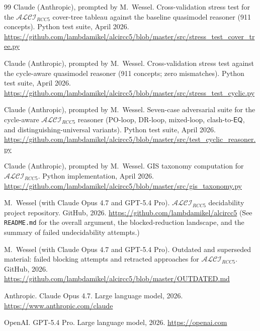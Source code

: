 \documentclass[
]{ceurart}
\theoremstyle{definition}
\newcommand{\ALCIRCC}[1]{\ensuremath{\mathcal{ALCI}_{\mathit{RCC#1}}}}
\newcommand{\EQ}{\ensuremath{\mathsf{EQ}}}
\begin{document}
\begin{thebibliography}{99}
Claude (Anthropic), prompted by M.\ Wessel.
\newblock Cross-validation stress test for the $\ALCIRCC{5}$
  cover-tree tableau against the baseline quasimodel reasoner
  (911 concepts).
\newblock Python test suite, April 2026.
\newblock \url{https://github.com/lambdamikel/alcircc5/blob/master/src/stress_test_cover_tree.py}

Claude (Anthropic), prompted by M.\ Wessel.
\newblock Cross-validation stress test against the cycle-aware
  quasimodel reasoner (911 concepts; zero mismatches).
\newblock Python test suite, April 2026.
\newblock \url{https://github.com/lambdamikel/alcircc5/blob/master/src/stress_test_cyclic.py}

Claude (Anthropic), prompted by M.\ Wessel.
\newblock Seven-case adversarial suite for the cycle-aware
  $\ALCIRCC{5}$ reasoner (PO-loop, DR-loop, mixed-loop,
  clash-to-$\EQ$, and distinguishing-universal variants).
\newblock Python test suite, April 2026.
\newblock \url{https://github.com/lambdamikel/alcircc5/blob/master/src/test_cyclic_reasoner.py}

Claude (Anthropic), prompted by M.\ Wessel.
\newblock GIS taxonomy computation for $\ALCIRCC{5}$.
\newblock Python implementation, April 2026.
\newblock \url{https://github.com/lambdamikel/alcircc5/blob/master/src/gis_taxonomy.py}


M.\ Wessel (with Claude Opus 4.7 and GPT-5.4 Pro).
\newblock $\ALCIRCC{5}$ decidability project repository.
\newblock GitHub, 2026.
\newblock \url{https://github.com/lambdamikel/alcircc5}
\newblock (See \texttt{README.md} for the overall argument, the
  blocked-reduction landscape, and the summary of failed
  undecidability attempts.)

M.\ Wessel (with Claude Opus 4.7 and GPT-5.4 Pro).
\newblock Outdated and superseded material: failed blocking
  attempts and retracted approaches for $\ALCIRCC{5}$.
\newblock GitHub, 2026.
\newblock \url{https://github.com/lambdamikel/alcircc5/blob/master/OUTDATED.md}


Anthropic.
\newblock Claude Opus 4.7.
\newblock Large language model, 2026.
\newblock \url{https://www.anthropic.com/claude}

OpenAI.
\newblock GPT-5.4 Pro.
\newblock Large language model, 2026.
\newblock \url{https://openai.com}

\end{thebibliography}
\end{document}
